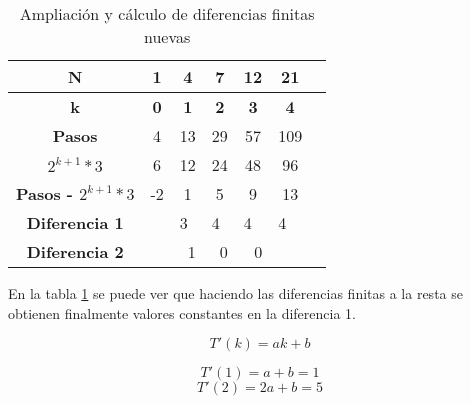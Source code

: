 \documentclass{uc3mpracticas}
\begin{document}
\begin{table}[!h]
  \centering
\begin{tabular}{|c|p{1cm}|p{1cm}|p{1cm}|p{1cm}|p{1cm}|p{1cm}|}
\hline
\textbf{N}     & \multicolumn{1}{c|}{\textbf{1}} & \multicolumn{1}{c|}{\textbf{4}} & \multicolumn{1}{c|}{\textbf{7}} & \multicolumn{1}{c|}{\textbf{12}} & \multicolumn{1}{c|}{\textbf{21}} \\ \hline
\textbf{k}     & \multicolumn{1}{c|}{\textbf{0}} & \multicolumn{1}{c|}{\textbf{1}} & \multicolumn{1}{c|}{\textbf{2}} & \multicolumn{1}{c|}{\textbf{3}} & \multicolumn{1}{c|}{\textbf{4}} \\ \hline
\textbf{Pasos} & \multicolumn{1}{c|}{4}          & \multicolumn{1}{c|}{13}          & \multicolumn{1}{c|}{29}         & \multicolumn{1}{c|}{57}         & \multicolumn{1}{c|}{109} \\ \hline
\textbf{$2^{k+1} * 3$} & \multicolumn{1}{c|}{6}          & \multicolumn{1}{c|}{12}          & \multicolumn{1}{c|}{24}         & \multicolumn{1}{c|}{48}         & \multicolumn{1}{c|}{96} \\ \hline
\textbf{Pasos - $2^{k+1} * 3$} & \multicolumn{1}{c|}{-2}          & \multicolumn{1}{c|}{1}          & \multicolumn{1}{c|}{5}         & \multicolumn{1}{c|}{9}         & \multicolumn{1}{c|}{13} \\ \hline

\textbf{Diferencia 1}                  &                                                         & 3                                                       & 4                               & 4                              &   4                           \\ \hline
\textbf{Diferencia 2}                  &                                                         & \multicolumn{1}{r|}{1}                                  & \multicolumn{1}{r|}{0}          & \multicolumn{1}{r|}{0}       &                         \\ \hline
\end{tabular}
\caption{Ampliación y cálculo de diferencias finitas nuevas}
\label{tab:difUlt2}
\end{table}


En la tabla \ref{tab:difUlt2} se puede ver que haciendo las diferencias finitas a la resta se obtienen finalmente valores constantes en la diferencia 1.



$$ T'(k) = ak + b $$

$$ T'(1) = a + b = 1$$
$$ T'(2) = 2a + b = 5$$
\end{document}
